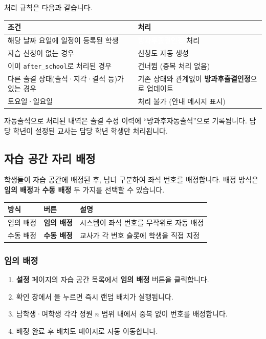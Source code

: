 \documentclass[a4paper,12pt]{article}
\newcommand{\menu}[1]{\textcolor{primary}{\textbf{#1}}}
\newcommand{\key}[1]{\fbox{\small\texttt{#1}}}
\newcommand{\badge}[2]{\colorbox{#1}{\small\textcolor{white}{\textbf{#2}}}}
\begin{document}
처리 규칙은 다음과 같습니다.

\begin{center}
\begin{tabular}{ll}
\toprule
\textbf{조건} & \textbf{처리} \\
\midrule
해당 날짜 요일에 일정이 등록된 학생 & \badge{success}{방과후출결인정} 처리 \\
자습 신청이 없는 경우 & 신청도 자동 생성 \\
이미 \texttt{after\_school}로 처리된 경우 & 건너뜀 (중복 처리 없음) \\
다른 출결 상태(출석·지각·결석 등)가 있는 경우 & 기존 상태와 관계없이 \textbf{방과후출결인정}으로 업데이트 \\
토요일·일요일 & 처리 불가 (안내 메시지 표시) \\
\bottomrule
\end{tabular}
\end{center}

\begin{notebox}
  자동출석으로 처리된 내역은 출결 수정 이력에 ``방과후자동출석''으로 기록됩니다.
  담당 학년이 설정된 교사는 담당 학년 학생만 처리됩니다.
\end{notebox}

\subsection{자습 공간 자리 배정}

학생들이 자습 공간에 배정된 후, 남녀 구분하여 좌석 번호를 배정합니다.
배정 방식은 \textbf{임의 배정}과 \textbf{수동 배정} 두 가지를 선택할 수 있습니다.

\begin{center}
\begin{tabular}{lll}
\toprule
\textbf{방식} & \textbf{버튼} & \textbf{설명} \\
\midrule
임의 배정 & \menu{임의 배정} & 시스템이 좌석 번호를 무작위로 자동 배정 \\
수동 배정 & \menu{수동 배정} & 교사가 각 번호 슬롯에 학생을 직접 지정 \\
\bottomrule
\end{tabular}
\end{center}

\subsubsection{임의 배정}

\begin{enumerate}[leftmargin=1.5em]
    \item \menu{설정} 페이지의 자습 공간 목록에서 \menu{임의 배정} 버튼을 클릭합니다.
    \item 확인 창에서 \key{확인}을 누르면 즉시 랜덤 배치가 실행됩니다.
    \item 남학생·여학생 각각 정원 $n$ 범위 내에서 중복 없이 번호를 배정합니다.
    \item 배정 완료 후 배치도 페이지로 자동 이동합니다.
\end{enumerate}
\end{document}
